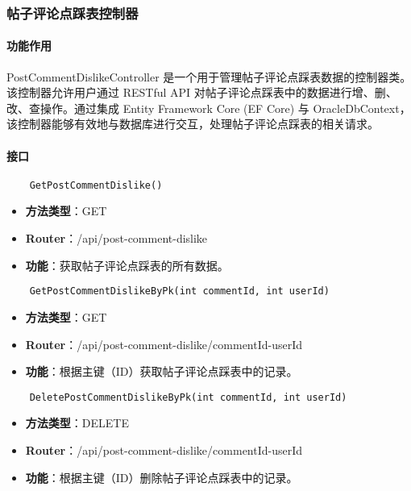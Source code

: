 \subsubsection{帖子评论点踩表控制器}

\paragraph{功能作用}

PostCommentDislikeController 是一个用于管理帖子评论点踩表数据的控制器类。该控制器允许用户通过 RESTful API 对帖子评论点踩表中的数据进行增、删、改、查操作。通过集成 Entity Framework Core (EF Core) 与 OracleDbContext，该控制器能够有效地与数据库进行交互，处理帖子评论点踩表的相关请求。

\paragraph{接口}

\begin{verbatim}
	GetPostCommentDislike()
\end{verbatim}

\begin{itemize}
	\item \textbf{方法类型}：GET
	\item \textbf{Router}：/api/post-comment-dislike
	\item \textbf{功能}：获取帖子评论点踩表的所有数据。
\end{itemize}

\begin{verbatim}
	GetPostCommentDislikeByPk(int commentId, int userId)
\end{verbatim}

\begin{itemize}
	\item \textbf{方法类型}：GET
	\item \textbf{Router}：/api/post-comment-dislike/{commentId}-{userId}
	\item \textbf{功能}：根据主键（ID）获取帖子评论点踩表中的记录。
\end{itemize}

\begin{verbatim}
	DeletePostCommentDislikeByPk(int commentId, int userId)
\end{verbatim}

\begin{itemize}
	\item \textbf{方法类型}：DELETE
	\item \textbf{Router}：/api/post-comment-dislike/{commentId}-{userId}
	\item \textbf{功能}：根据主键（ID）删除帖子评论点踩表中的记录。
\end{itemize}

